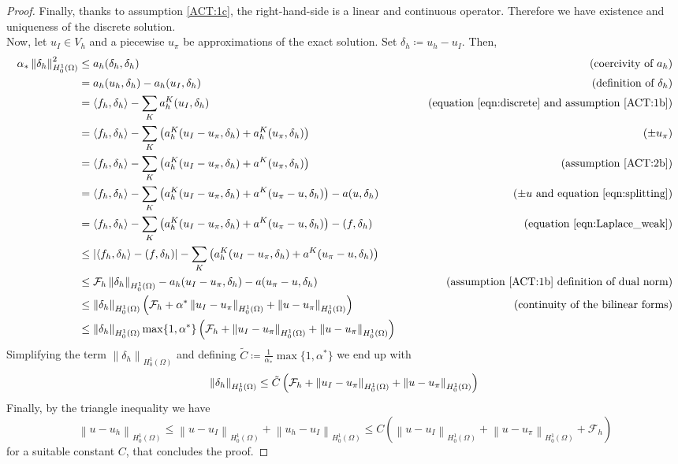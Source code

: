\documentclass[10pt]{article}
\newcommand{\norm}[2]{\left\lVert#1\right\rVert_{#2}}
\begin{document}
\begin{proof}
	Finally, thanks to assumption \eqref{ACT:1c}, the right-hand-side is a linear and continuous operator. Therefore we have existence and uniqueness of the discrete solution. \\
	Now, let $u_I \in V_h$ and a piecewise $u_\pi$ be approximations of the exact solution. Set $\delta_h \coloneqq u_h-u_I$. Then,
	\begin{align*}
		\alpha_* \norm{\delta_h}{H_0^1(\Omega)}^2 &\leq a_h(\delta_h,\delta_h) & \tag{coercivity of $a_h$} \\
		&=a_h(u_h,\delta_h)-a_h(u_I,\delta_h) & \tag{definition of $\delta_h$} \\
		&= \langle f_h,\delta_h \rangle-\sum_{K}a_h^K(u_I,\delta_h) & \tag{equation \eqref{eqn:discrete} and assumption \eqref{ACT:1b}} \\
		&= \langle f_h,\delta_h \rangle-\sum_{K} \left( a_h^K(u_I-u_\pi,\delta_h)+a_h^K(u_\pi,\delta_h) \right) & \tag{$\pm u_\pi$} \\
		&= \langle f_h,\delta_h \rangle-\sum_{K} \left( a_h^K(u_I-u_\pi,\delta_h)+a^K(u_\pi,\delta_h) \right) & \tag{assumption \eqref{ACT:2b}} \\
		&= \langle f_h,\delta_h \rangle-\sum_{K} \left( a_h^K(u_I-u_\pi,\delta_h)+a^K(u_\pi-u,\delta_h) \right)-a(u,\delta_h) & \tag{$\pm u$ and equation \eqref{eqn:splitting}} \\
		&= \langle f_h,\delta_h \rangle-\sum_{K} \left( a_h^K(u_I-u_\pi,\delta_h)+a^K(u_\pi-u,\delta_h) \right)-(f,\delta_h) & \tag{equation \eqref{eqn:Laplace_weak}} \\
		&\leq |\langle f_h,\delta_h \rangle - (f,\delta_h)|-\sum_{K} \left( a_h^K(u_I-u_\pi,\delta_h)+a^K(u_\pi-u,\delta_h) \right)\\
		&\leq \mathcal{F}_h \norm{\delta_h}{H_0^1(\Omega)}- a_h(u_I-u_\pi,\delta_h)-a(u_\pi-u,\delta_h) & \tag{assumption \eqref{ACT:1b} definition of dual norm}\\
		&\leq \norm{\delta_h}{H_0^1(\Omega)} \left( \mathcal{F}_h + \alpha^* \norm{u_I-u_\pi}{H_0^1(\Omega)}+ \norm{u-u_\pi}{H_0^1(\Omega)} \right) & \tag{continuity of the bilinear forms}\\
		&\leq \norm{\delta_h}{H_0^1(\Omega)} \max \lbrace 1, \alpha^* \rbrace \left( \mathcal{F}_h + \norm{u_I-u_\pi}{H_0^1(\Omega)}+ \norm{u-u_\pi}{H_0^1(\Omega)} \right) \\
	\end{align*}
	Simplifying the term $\norm{\delta_h}{H_0^1(\Omega)}$ and defining $\tilde{C} \coloneqq \frac{1}{\alpha_*} \max \lbrace 1, \alpha^* \rbrace$ we end up with
	$$\norm{\delta_h}{H_0^1(\Omega)} \leq \tilde{C} \left( \mathcal{F}_h + \norm{u_I-u_\pi}{H_0^1(\Omega)}+ \norm{u-u_\pi}{H_0^1(\Omega)} \right) \\
	$$ 
	Finally, by the triangle inequality we have
	$$\norm{u-u_h}{H_0^1(\Omega)} \leq \norm{u-u_I}{H_0^1(\Omega)}+ \norm{u_h-u_I}{H_0^1(\Omega)} \leq C \left( 
	\norm{u-u_I}{H_0^1(\Omega)}+\norm{u-u_\pi}{H_0^1(\Omega)}+\mathcal{F}_h \right) $$
	for a suitable constant $C$, that concludes the proof.
\end{proof}
\end{document}
